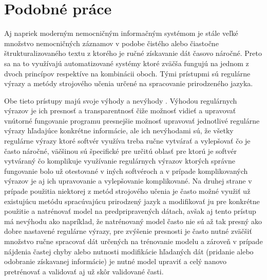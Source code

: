 \chapter{Podobné práce}

Aj napriek moderným nemocničným informačným
systémom je stále veľké množstvo nemocničných záznamov v
podobe čistého alebo čiastočne štrukturalizovaného 
textu z ktorého je ručné získavanie dát časovo náročné.
Preto sa na to využívajú automatizované systémy
ktoré zväčša fungujú na jednom z dvoch princípov 
respektíve na kombinácii oboch. Tými prístupmi
sú regulárne výrazy a metódy strojového učenia
určené na spracovanie prirodzeného jazyka.

Obe tieto prístupy majú svoje výhody a nevýhody \cite{nlpAndRegex}. 
Výhodou regulárnych výrazov je ich presnosť a 
transparentnosť čiže možnosť vidieť a upravovať
vnútorné fungovanie programu presnejšie možnosť 
upravovať jednotlivé regulárne výrazy
hľadajúce konkrétne informácie, ale ich nevýhodami sú,
že všetky regulárne výrazy ktoré softvér využíva 
treba ručne vytvárať a vylepšovať
čo je často náročné, väčšinou sú špecifické pre určitú oblasť
pre ktorú je softvér vytváraný čo komplikuje využívanie
regulárnych výrazov ktorých správne fungovanie bolo už 
otestované v iných softvéroch 
a v prípade komplikovaných výrazov je aj ich 
upravovanie a vylepšovanie komplikované. 
Na druhej strane v prípade použitia niektorej
z metód strojového učenia je často možné využiť už 
existujúcu metódu spracúvajúcu prirodzený jazyk a
modifikovať ju pre konkrétne použitie a natrénovať
model na predpripravených dátach, avšak aj tento prístup
má nevýhodu ako napríklad, že natrénovaný model
často nie sú až tak presný ako dobre nastavené
regulárne výrazy, pre zvýšenie presnosti je často nutné
zväčšiť množstvo ručne spracovať dát určených na trénovanie 
modelu a zároveň v prípade nájdenia častej chyby alebo 
nutnosti modifikácie hľadaných dát (pridanie alebo 
odobranie získavanej informácie) je nutné model 
upraviť a celý nanovo pretrénovať a validovať aj už
skôr validované časti.

